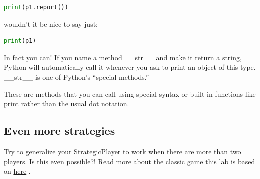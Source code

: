 \documentclass[12pt]{article}
\begin{document}
\bigskip

\begin{lstlisting}[language=Python]
    print(p1.report())
\end{lstlisting}

\bigskip

wouldn’t it be nice to say just:

\bigskip

\begin{lstlisting}[language=Python]
    print(p1)
\end{lstlisting}

\bigskip

\noindent In fact you can! If you name a method \_\_str\_\_ and make it return a string, Python will automatically call it whenever
you ask to print an object of this type. \_\_str\_\_ is one of Python’s “special methods.”

\bigskip

\noindent These are methods that you can call using special syntax or built-in functions like print rather than the usual dot notation.

\bigskip

\subsection*{Even more strategies}
Try to generalize your StrategicPlayer to work when there are more than two players. Is this even possible?! Read more about the classic game this lab is based on \href{https://en.wikipedia.org/wiki/Nim}{here} .
\end{document}
